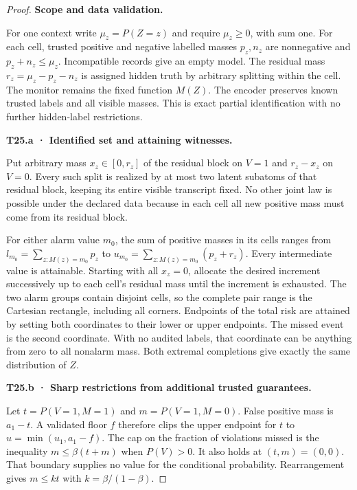 \begin{proof}

\textbf{Scope and data validation.}

For one context write \(\mu_z=P(Z=z)\) and require \(\mu_z\ge0\), with sum one. For each cell, trusted positive and negative labelled masses \(p_z,n_z\) are nonnegative and \(p_z+n_z\le \mu_z\). Incompatible records give an empty model. The residual mass \(r_z=\mu_z-p_z-n_z\) is assigned hidden truth by arbitrary splitting within the cell. The monitor remains the fixed function \(M(Z)\). The encoder preserves known trusted labels and all visible masses. This is exact partial identification with no further hidden-label restrictions.

\textbf{T25.a · Identified set and attaining witnesses.}

Put arbitrary mass \(x_z\in[0,r_z]\) of the residual block on \(V=1\) and \(r_z-x_z\) on \(V=0\). Every such split is realized by at most two latent subatoms of that residual block, keeping its entire visible transcript fixed. No other joint law is possible under the declared data because in each cell all new positive mass must come from its residual block.

For either alarm value \(m_0\), the sum of positive masses in its cells ranges from \(l_{m_0}=\sum_{z:M(z)=m_0}p_z\) to \(u_{m_0}=\sum_{z:M(z)=m_0}(p_z+r_z)\). Every intermediate value is attainable. Starting with all \(x_z=0\), allocate the desired increment successively up to each cell's residual mass until the increment is exhausted. The two alarm groups contain disjoint cells, so the complete pair range is the Cartesian rectangle, including all corners. Endpoints of the total risk are attained by setting both coordinates to their lower or upper endpoints. The missed event is the second coordinate. With no audited labels, that coordinate can be anything from zero to all nonalarm mass. Both extremal completions give exactly the same distribution of \(Z\).

\textbf{T25.b · Sharp restrictions from additional trusted guarantees.}

Let \(t=P(V=1,M=1)\) and \(m=P(V=1,M=0)\). False positive mass is \(a_1-t\). A validated floor \(f\) therefore clips the upper endpoint for \(t\) to \(u=\min(u_1,a_1-f)\). The cap on the fraction of violations missed is the inequality \(m\le\beta(t+m)\) when \(P(V)>0\). It also holds at \((t,m)=(0,0)\). That boundary supplies no value for the conditional probability. Rearrangement gives \(m\le kt\) with \(k=\beta/(1-\beta)\).


\end{proof}
